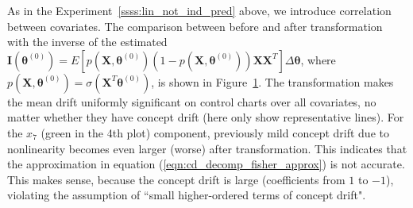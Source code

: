 \documentclass[twoside,11pt]{article}
\begin{document}
\begin{enumerate}[(I)]
\begin{figure}[!htbp]
{%
}
  \label{fig:log_reg_not_ind_X}
\end{figure}

As in the Experiment~\ref{ssss:lin_not_ind_pred} above, we introduce correlation between {covariates.} The comparison between before and after transformation with {the inverse of the estimated} {$\mathbf {I} ( {\bm{\theta}} ^{ (0)}) = E [{p} (\bm {X},\bm { \theta} ^{ (0)}) (1-{p}(\bm {X},\bm { \theta} ^{ (0)})) \bm {X} \bm {X}^T] \Delta \bm{ \theta}$}, where {$p (\bm {X},\bm { \theta} ^{ (0)}) = \sigma ( \bm {X}^T\bm { \theta} ^{ (0)})$}, is shown in Figure~\ref{fig:log_reg_not_ind_X}. The transformation makes the mean {drift} uniformly significant on control charts over all {covariates,} no matter whether they have concept drift (here only show representative lines). For the $x_7$ (green in the 4th plot) component, previously mild concept drift due to nonlinearity becomes even larger (worse) after transformation. This indicates that the approximation in equation (\ref{eqn:cd_decomp_fisher_approx}) is not accurate. This makes sense, because the concept drift is large (coefficients from $1$ to $-1$), violating the assumption of ``small higher-ordered terms of concept drift". 


\end{enumerate}
\end{document}
